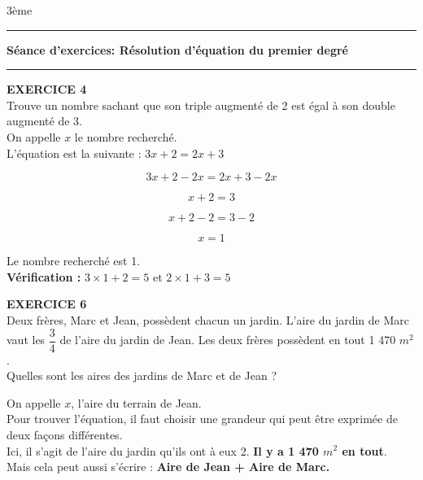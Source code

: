 \documentclass[a4paper,11pt]{article}
\newcommand{\titre}[5] 
{
\noindent #2 \hfill #4 \\
#3 \hfill #5

\vspace{-1.6cm}

\begin{center}\rule{6cm}{0.5mm}\end{center}
\vspace{0.2cm}
\begin{center}{\large{\textbf{#1}}}\end{center}
\begin{center}\rule{6cm}{0.5mm}\end{center}
}
\begin{document}
\pagestyle{empty}
\titre{Séance d'exercices: Résolution d'équation du premier degré}{}{}{3ème}{}

\vspace*{0.2cm}


 
 
\textbf{EXERCICE 4}\\
 
 Trouve un nombre sachant que son triple augmenté de 2 est égal à son double augmenté de 3.\\
 
 \color{red}
On appelle $x$ le nombre recherché.\\


L'équation est la suivante : \hspace*{1cm} $3x+2=2x+3$ 

$$3x+2-2x=2x+3-2x$$

$$x+2=3$$

$$x+2-2=3-2$$
 
 $$x=1$$
 
 Le nombre recherché est 1.\\
 
 \textbf{Vérification :} $ 3 \times 1 + 2 = 5$ et $2 \times 1 + 3 = 5$ \\
 
 \color{black}




\textbf{EXERCICE 6}\\

Deux frères, Marc et Jean, possèdent chacun un jardin. L'aire du jardin de Marc vaut les $\dfrac{3}{4}$ de l'aire du jardin de Jean. Les deux frères possèdent en tout 1 470 $ m^{2} $.\\

Quelles sont les aires des jardins de Marc et de Jean  ?\\

\color{red}


On appelle $x$, l'aire du terrain de Jean.\\

Pour trouver l'équation, il faut choisir une grandeur qui peut être exprimée de deux façons différentes.\\

Ici, il s'agit de l'aire du jardin qu'ils ont à eux 2.\hspace*{1cm} \textbf{Il y a 1 470 $m^{2}$ en tout}.\\

Mais cela peut aussi s'écrire : \textbf{Aire de Jean + Aire de Marc.}\\
\end{document}
